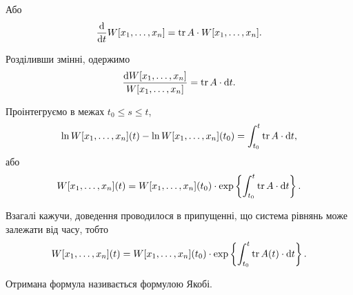 Або
\begin{equation*}
	\frac{\mathop{}\!\mathrm{d}}{\mathop{}\!\mathrm{d} t} W[x_1, \ldots, x_n] = \operatorname{tr} A \cdot W[x_1, \ldots, x_n].
\end{equation*}

Розділивши змінні, одержимо
\begin{equation*}
	\frac{\mathop{}\!\mathrm{d} W[x_1, \ldots, x_n]}{W[x_1, \ldots, x_n]}  = \operatorname{tr} A \cdot \mathop{}\!\mathrm{d} t.
\end{equation*}

Проінтегруємо в межах $t_0 \le s \le t$,
\begin{equation*}
	\ln W[x_1, \ldots, x_n](t) - \ln W[x_1, \ldots, x_n](t_0) = \int_{t_0}^t \operatorname{tr} A \cdot \mathop{}\!\mathrm{d} t,
\end{equation*}
або 
\begin{equation*}
	W[x_1, \ldots, x_n](t) = W[x_1, \ldots, x_n](t_0) \cdot \exp\left\{\int_{t_0}^t \operatorname{tr} A \cdot \mathop{}\!\mathrm{d} t\right\}.
\end{equation*}

Взагалі кажучи, доведення проводилося в припущенні, що система рівнянь може залежати від часу, тобто
\begin{equation*}
	W[x_1, \ldots, x_n](t) = W[x_1, \ldots, x_n](t_0) \cdot \exp\left\{\int_{t_0}^t \operatorname{tr} A(t) \cdot \mathop{}\!\mathrm{d} t\right\}.
\end{equation*}

Отримана формула називається формулою Якобі.
